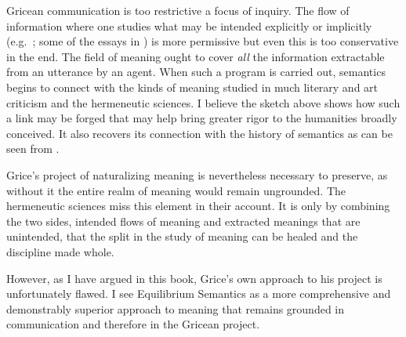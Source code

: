 Gricean communication is too restrictive a focus of inquiry. The flow of information where one studies what may be intended explicitly or implicitly (e.g.\ \citealt{hirsch:vi, hirsch:ai}; some of the essays in \citealt{iseminger:ii}) is more permissive but even this is too conservative in the end. The field of meaning ought to cover \emph{all} the information extractable from an utterance by an agent. When such a program is carried out, semantics begins to connect with the kinds of meaning studied in much literary and art criticism and the hermeneutic sciences. I believe the sketch above shows how such a link may be forged that may help bring greater rigor to the humanities broadly conceived. It also recovers its connection with the history of semantics as can be seen from \citet{bhsv:es}.

Grice's project of naturalizing meaning is nevertheless necessary to preserve, as without it the entire realm of meaning would remain ungrounded. The hermeneutic sciences miss this element in their account. It is only by combining the two sides, intended flows of meaning and extracted meanings that are unintended, that the split in the study of meaning can be healed and the discipline made whole.

However, as I have argued in this book, Grice's own approach to his project is unfortunately flawed. I see Equilibrium Semantics as a more comprehensive and demonstrably superior approach to meaning that remains grounded in communication and therefore in the Gricean project.


%
%


